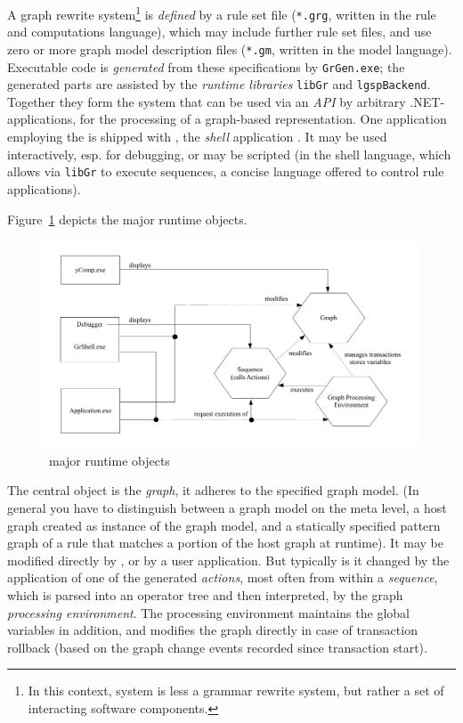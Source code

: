 A graph rewrite system\footnote{In this context, system is less a grammar rewrite system, but rather a set of interacting software components.} is \emph{defined} by a rule set file (\texttt{*.grg}, written in the rule and computations language), which may include further rule set files, and use zero or more graph model description files (\texttt{*.gm}, written in the model language).
Executable code is \emph{generated} from these specifications by \texttt{GrGen.exe}; 
the generated parts are assisted by the \emph{runtime libraries} \texttt{libGr} and \texttt{lgspBackend}.
Together they form the system that can be used via an \emph{API} by arbitrary .NET-applications, for the processing of a graph-based representation.
One application employing the  is shipped with \GrG, the \emph{shell} application \GrShell.
It may be used interactively, esp. for debugging, or may be scripted (in the shell language, which allows via \texttt{libGr} to execute sequences, a concise language offered to control rule applications).

Figure~\ref{process} depicts the major runtime objects.

\begin{figure}[htbp]
  \centering
  \includegraphics[width=\textwidth]{fig/OverviewRuntimeArtefacts}
  \caption{\GrG\ major runtime objects}
  \label{process}
\end{figure}

The central object is the \emph{graph}, it adheres to the specified graph model.
(In general you have to distinguish between a graph model on the meta level, a host graph created as instance of the graph model, and a statically specified pattern graph of a rule that matches a portion of the host graph at runtime).
It may be modified directly by \GrShell, or by a user application.
But typically is it changed by the application of one of the generated \emph{actions}, most often from within a \emph{sequence}, which is parsed into an operator tree and then interpreted, by the graph \emph{processing environment}.
The processing environment maintains the global variables in addition, and modifies the graph directly in case of transaction rollback (based on the graph change events recorded since transaction start).

